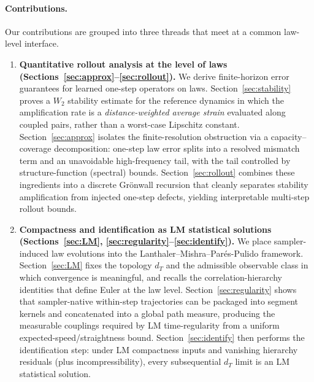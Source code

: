 \documentclass{article}
\numberwithin{equation}{section}
\theoremstyle{plain}
\theoremstyle{definition}
\theoremstyle{remark}
\begin{document}
\paragraph{Contributions.}
Our contributions are grouped into three threads that meet at a common law-level interface.

\begin{enumerate}[label=\textbf{(\Roman*)},leftmargin=2.4em]
\item \textbf{Quantitative rollout analysis at the level of laws (Sections~\ref{sec:approx}--\ref{sec:rollout}).}
We derive finite-horizon error guarantees for learned one-step operators on laws.
Section~\ref{sec:stability} proves a $W_2$ stability estimate for the reference dynamics in which the amplification rate is a
\emph{distance-weighted average strain} evaluated along coupled pairs, rather than a worst-case Lipschitz constant.
Section~\ref{sec:approx} isolates the finite-resolution obstruction via a capacity--coverage decomposition:
one-step law error splits into a resolved mismatch term and an unavoidable high-frequency tail, with the tail controlled by
structure-function (spectral) bounds.
Section~\ref{sec:rollout} combines these ingredients into a discrete Gr\"onwall recursion that cleanly separates stability
amplification from injected one-step defects, yielding interpretable multi-step rollout bounds.

\item \textbf{Compactness and identification as LM statistical solutions (Sections~\ref{sec:LM}, \ref{sec:regularity}--\ref{sec:identify}).}
We place sampler-induced law evolutions into the Lanthaler--Mishra--Par\'es-Pulido framework.
Section~\ref{sec:LM} fixes the topology $d_T$ and the admissible observable class in which convergence is meaningful, and
recalls the correlation-hierarchy identities that define Euler at the law level.
Section~\ref{sec:regularity} shows that sampler-native within-step trajectories can be packaged into segment kernels and
concatenated into a global path measure, producing the measurable couplings required by LM time-regularity from a uniform
expected-speed/straightness bound.
Section~\ref{sec:identify} then performs the identification step: under LM compactness inputs and vanishing hierarchy
residuals (plus incompressibility), every subsequential $d_T$ limit is an LM statistical solution.


\end{enumerate}
\end{document}
